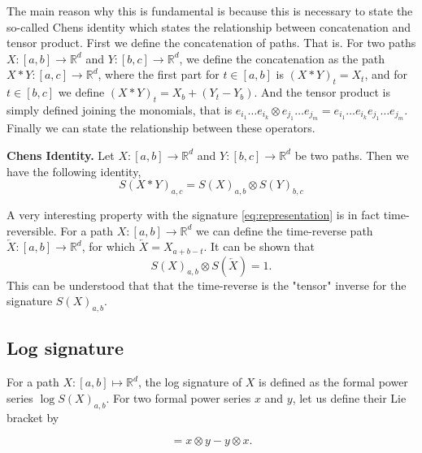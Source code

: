The main reason why this is fundamental is because this is necessary to state the so-called Chens identity which states the relationship between concatenation and tensor product. First we define the concatenation of paths. That is. For two paths $X: \left[ a,b \right] \to \mathbb{R} ^{d}$  and $Y : \left[ b,c \right]
\to  \mathbb{R} ^{d}$, we define the concatenation as the path $X * Y : \left[ a,c \right]  \to \mathbb{R} ^{d}$, where the first part for $t \in  \left[ a,b \right] $ is $( X* Y) _{t} = X_{t}$, and for $t \in  \left[ b,c \right] $ we define $( X*Y)
_{t} = X_{b} + ( Y_{t} - Y_{b}) $. And the tensor product is simply defined joining the monomials, that is  $e_{i_{1}} \ldots e_{i_{k}} \otimes e_{j_{1}} \ldots e_{j_{m}}  = e_{i_{1}} \ldots e_{i_{k}}  e_{j_{1}} \ldots e_{j_{m}}$. Finally we can
state the relationship between these operators.

\begin{theorem}
    \textbf{Chens Identity.} Let $X: \left[ a,b \right] \to  \mathbb{R} ^{d}$ and $Y: \left[ b,c \right] \to \mathbb{R} ^{d}$ be two paths. Then we have the following identity,
    \begin{equation}
        S( X*Y) _{a,c} = S( X) _{a,b} \otimes  S( Y) _{b,c}
    \end{equation}

\end{theorem}


A very interesting property with the signature \eqref{eq:representation} is in fact time-reversible. For a path $X: \left[ a,b \right]  \to \mathbb{R} ^{d}$ we can define the time-reverse path $\overleftarrow{X}: \left[ a,b \right]  \to  \mathbb{R} ^{d} $, for
which $ \overleftarrow{X}  = X_{a+b -t}$. It can be shown that \begin{equation}
    S( X) _{a,b} \otimes S( \overleftarrow{X}) = 1.
\end{equation}
This can be understood that that the time-reverse is the "tensor" inverse for the signature $S( X) _{a,b}$.


\subsection{Log signature}%
\label{sub:log_signature}


For a path $X : [a, b] \mapsto \mathbb{R}^d$, the log signature of $X$ is defined as the formal power series $\log S(X)_{a,b}$. For two formal power series $x$ and $y$, let us define their Lie bracket by

\begin{equation}
[x, y] = x \otimes y - y \otimes x. \tag{1.55}
\end{equation}

